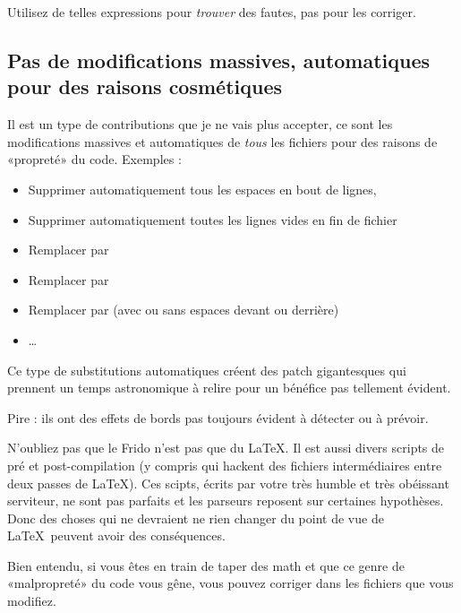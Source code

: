 Utilisez de telles expressions pour \emph{trouver} des fautes, pas pour les corriger.

\subsection{Pas de modifications massives, automatiques pour des raisons cosmétiques}

Il est un type de contributions que je ne vais plus accepter, ce sont les modifications massives et automatiques de \emph{tous} les fichiers pour des raisons de «propreté» du code. Exemples : 
\begin{itemize}
    \item Supprimer automatiquement tous les espaces en bout de lignes,
    \item Supprimer automatiquement toutes les lignes vides en fin de fichier
    \item Remplacer  par 
    \item Remplacer \info{\textbackslash [} par 
    \item Remplacer  par  (avec ou sans espaces devant ou derrière)
    \item \ldots
\end{itemize}

Ce type de substitutions automatiques créent des patch gigantesques qui prennent un temps astronomique à relire pour un bénéfice pas tellement évident.

Pire : ils ont des effets de bords pas toujours évident à détecter ou à prévoir.

N'oubliez pas que le Frido n'est pas que du \LaTeX. Il est aussi divers scripts de pré et post-compilation (y compris qui hackent des fichiers intermédiaires entre deux passes de \LaTeX). Ces scipts, écrits par votre très humble et très obéissant serviteur, ne sont pas parfaits et les parseurs reposent sur certaines hypothèses. Donc des choses qui ne devraient ne rien changer du point de vue de \LaTeX\ peuvent avoir des conséquences.

Bien entendu, si vous êtes en train de taper des math et que ce genre de «malpropreté» du code vous gêne, vous pouvez corriger dans les fichiers que vous modifiez.
